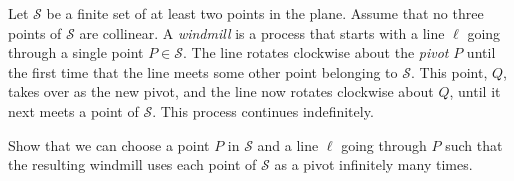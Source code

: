 Let $\mathcal{S}$ be a finite set of at least two points in the plane.
Assume that no three points of $\mathcal S$ are collinear.
A \emph{windmill} is a process that starts with a
line $\ell$ going through a single point $P \in \mathcal S$.
The line rotates clockwise about the \emph{pivot} $P$ until the first time
that the line meets some other point belonging to $\mathcal S$.
This point, $Q$, takes over as the new pivot,
and the line now rotates clockwise about $Q$,
until it next meets a point of $\mathcal S$.
This process continues indefinitely.

Show that we can choose a point $P$ in $\mathcal S$ and
a line $\ell$ going through $P$ such that the resulting windmill
uses each point of $\mathcal S$ as a pivot infinitely many times.